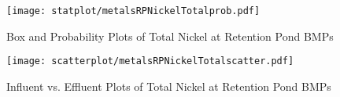         \begin{figure}[hb]   %
            \centering
            \texttt{[image: statplot/metalsRPNickelTotalprob.pdf]}
            \caption{Box and Probability Plots of Total Nickel at Retention Pond BMPs}
        \end{figure}         %
        
        
        \begin{figure}[hb]   %
            \centering
            \texttt{[image: scatterplot/metalsRPNickelTotalscatter.pdf]}
            \caption{Influent vs. Effluent Plots of Total Nickel at Retention Pond BMPs}
        \end{figure}         %
        \clearpage
        